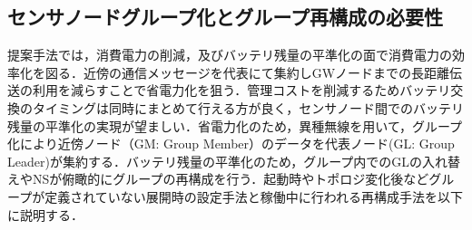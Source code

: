\subsection{センサノードグループ化とグループ再構成の必要性}
提案手法では，消費電力の削減，及びバッテリ残量の平準化の面で消費電力の効率化を図る．近傍の通信メッセージを代表にて集約しGWノードまでの長距離伝送の利用を減らすことで省電力化を狙う．管理コストを削減するためバッテリ交換のタイミングは同時にまとめて行える方が良く，センサノード間でのバッテリ残量の平準化の実現が望ましい．省電力化のため，異種無線を用いて，グループ化により近傍ノード（GM: Group Member）のデータを代表ノード(GL: Group Leader)が集約する．バッテリ残量の平準化のため，グループ内でのGLの入れ替えやNSが俯瞰的にグループの再構成を行う．起動時やトポロジ変化後などグループが定義されていない展開時の設定手法と稼働中に行われる再構成手法を以下に説明する．